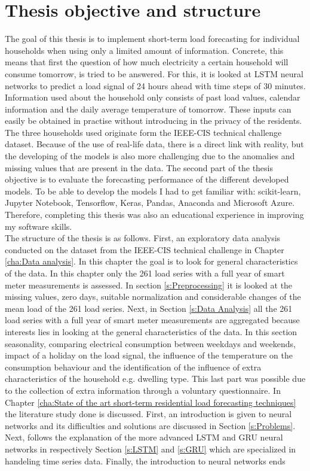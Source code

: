 \section{Thesis objective and structure}
The goal of this thesis is to implement short-term load forecasting for individual households when using only a limited amount of information. Concrete, this means that first the question of how much electricity a certain household will consume tomorrow, is tried to be answered. For this, it is looked at LSTM neural networks to predict a load signal of 24 hours ahead with time steps of 30 minutes. Information used about the household only consists of past load values, calendar information and the daily average temperature of tomorrow. These inputs can easily be obtained in practise without introducing in the privacy of the residents. The three households used originate form the IEEE-CIS technical challenge dataset. Because of the use of real-life data, there is a direct link with reality, but the developing of the models is also more challenging due to the anomalies and missing values that are present in the data. The second part of the thesis objective is to evaluate the forecasting performance of the different developed models. To be able to develop the models I had to get familiar with: scikit-learn, Jupyter Notebook, Tensorflow, Keras, Pandas, Anaconda and Microsoft Azure. Therefore, completing this thesis was also an educational experience in improving my software skills.\\ 

The structure of the thesis is as follows. First, an exploratory data analysis conducted on the dataset from the IEEE-CIS technical challenge in Chapter \ref{cha:Data analysis}. In this chapter the goal is to look for general characteristics of the data. In this chapter only the 261 load series with a full year of smart meter measurements is assessed. In section \ref{s:Preprocessing} it is looked at the missing values, zero days, suitable normalization and considerable changes of the mean load of the 261 load series. Next, in Section \ref{s:Data Analysis} all the 261 load series with a full year of smart meter measurements are aggregated because interests lies in looking at the general characteristics of the data. In this section seasonality, comparing electrical consumption between weekdays and weekends, impact of a holiday on the load signal, the influence of the temperature on the consumption behaviour and the identification of the influence of extra characteristics of the household e.g. dwelling type. This last part was possible due to the collection of extra information through a voluntary questionnaire. In Chapter \ref{cha:State of the art short-term residential load forecasting techniques} the literature study done is discussed. First, an introduction is given to neural networks and its difficulties and solutions are discussed in Section \ref{s:Problems}. Next, follows the explanation of the more advanced LSTM and GRU neural networks in respectively Section \ref{s:LSTM} and \ref{s:GRU} which are specialized in handeling time series data. Finally, the introduction to neural networks ends



